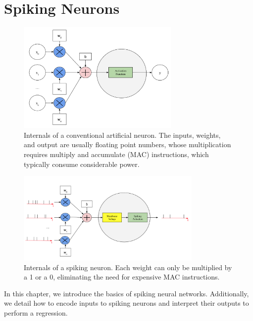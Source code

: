\documentclass [MS] {UCLAthesis}
\begin{document}

\chapter{Spiking Neurons}

\begin{figure}
    \centering
    \includegraphics[width=0.7\textwidth]{neuron_ann}
    \caption[Artificial neuron model]{Internals of a conventional artificial neuron. The inputs, weights, and output are usually floating point numbers, whose multiplication requires multiply and accumulate (MAC) instructions, which typically consume considerable power.}
    \label{fig:neuron_ann}
\end{figure}

\begin{figure}
    \centering
    \includegraphics[width=0.8\textwidth]{neuron_snn}
    \caption[Spiking neuron model]{Internals of a spiking neuron. Each weight can only be multiplied by a 1 or a 0, eliminating the need for expensive MAC instructions.}
    \label{fig:neuron_snn}
\end{figure}

In this chapter, we introduce the basics of spiking neural networks. Additionally, we detail how to encode inputs to spiking neurons and interpret their outputs to perform a regression.
\end{document}
